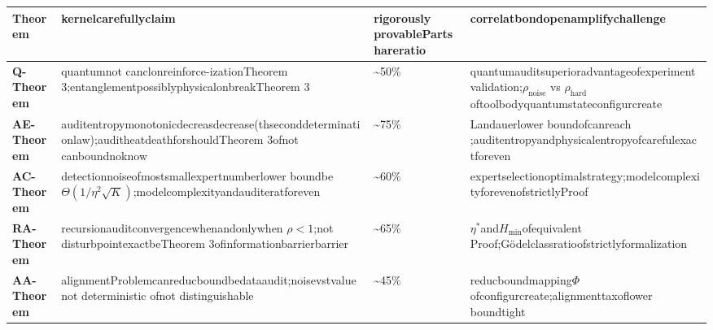 \documentclass[
  12pt,
]{article}
\begin{document}
\begin{longtable}[]{@{}
  >{\raggedright\arraybackslash}p{}
  >{\raggedright\arraybackslash}p{}
  >{\centering\arraybackslash}p{}
  >{\raggedright\arraybackslash}p{}@{}}
\toprule\noalign{}
\begin{minipage}[b]{\linewidth}\raggedright
Theorem
\end{minipage} & \begin{minipage}[b]{\linewidth}\raggedright
kernelcarefullyclaim 
\end{minipage} & \begin{minipage}[b]{\linewidth}\centering
rigorously provablePartshareratio
\end{minipage} & \begin{minipage}[b]{\linewidth}\raggedright
correlatbondopenamplifychallenge 
\end{minipage} \\
\midrule\noalign{}
\endhead
\bottomrule\noalign{}
\endlastfoot
\textbf{Q-Theorem} & quantumnot canclonreinforce-izationTheorem
3;entanglementpossiblyphysicalonbreakTheorem 3 & \textasciitilde50\% &
quantumauditsuperioradvantageofexperimentvalidation;\(\rho_{\text{noise}}\) vs
\(\rho_{\text{hard}}\)oftoolbodyquantumstateconfigurcreate \\
\textbf{AE-Theorem} & auditentropymonotonicdecreasdecrease(thseconddeterminationlaw);auditheatdeathforshouldTheorem
3ofnot canboundnoknow & \textasciitilde75\% &
Landauerlower boundofcanreach ;auditentropyandphysicalentropyofcarefulexactforeven \\
\textbf{AC-Theorem} & detectionnoiseofmostsmallexpertnumberlower boundbe
\(\Theta(1/\eta^2\sqrt{K})\);modelcomplexityandauditeratforeven &
\textasciitilde60\% & expertselectionoptimalstrategy;modelcomplexityforevenofstrictlyProof \\
\textbf{RA-Theorem} & recursionauditconvergencewhenandonlywhen \(\rho<1\);not disturbpointexactbeTheorem
3ofinformationbarrierbarrier & \textasciitilde65\% &
\(\eta^*\)and\(H_{\min}\)ofequivalent Proof;Gödelclassratioofstrictlyformalization \\
\textbf{AA-Theorem} &
alignmentProblemcanreducboundbedataaudit;noisevstvaluenot deterministic ofnot distinguishable &
\textasciitilde45\% & reducboundmapping\(\Phi\)ofconfigurcreate;alignmenttaxoflower boundtight  \\
\end{longtable}
\end{document}
